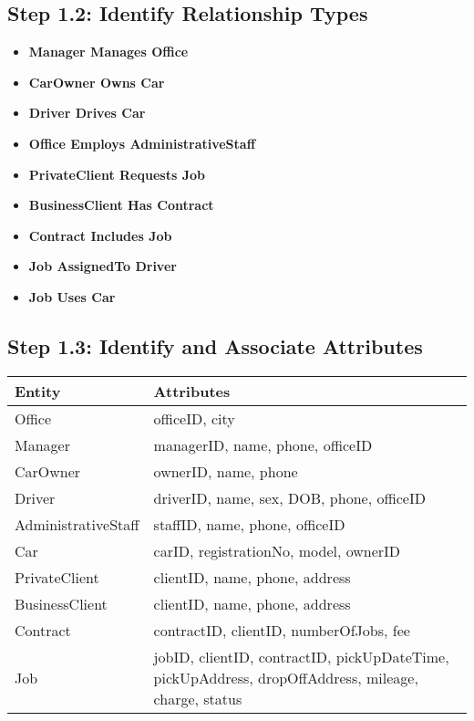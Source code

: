 \documentclass[a4paper,12pt]{article}
\begin{document}
\subsection*{Step 1.2: Identify Relationship Types}
\begin{itemize}
    \item \textbf{Manager Manages Office}
    \item \textbf{CarOwner Owns Car}
    \item \textbf{Driver Drives Car}
    \item \textbf{Office Employs AdministrativeStaff}
    \item \textbf{PrivateClient Requests Job}
    \item \textbf{BusinessClient Has Contract}
    \item \textbf{Contract Includes Job}
    \item \textbf{Job AssignedTo Driver}
    \item \textbf{Job Uses Car}
\end{itemize}

\subsection*{Step 1.3: Identify and Associate Attributes}
\begin{table}[ht]
\centering
\begin{tabularx}{\textwidth}{|X|X|}
\hline
\rowcolor{blue!20} \textbf{Entity} & \textbf{Attributes} \\
\hline
Office & officeID, city \\
Manager & managerID, name, phone, officeID \\
CarOwner & ownerID, name, phone \\
Driver & driverID, name, sex, DOB, phone, officeID \\
AdministrativeStaff & staffID, name, phone, officeID \\
Car & carID, registrationNo, model, ownerID \\
PrivateClient & clientID, name, phone, address \\
BusinessClient & clientID, name, phone, address \\
Contract & contractID, clientID, numberOfJobs, fee \\
Job & jobID, clientID, contractID, pickUpDateTime, pickUpAddress, dropOffAddress, mileage, charge, status \\
\hline
\end{tabularx}
\end{table}
\end{document}

